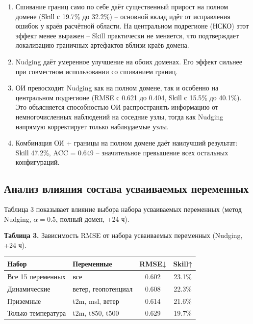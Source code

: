 \documentclass[14pt,a4paper]{extarticle}
\newcounter{none}
\numberwithin{table}{section}
\numberwithin{figure}{section}
\numberwithin{equation}{section}
\begin{document}
\begin{enumerate}
\def\labelenumi{\arabic{enumi}.}
\item
  Сшивание границ само по себе даёт существенный прирост на
  полном домене (Skill с 19.7\% до 32.2\%) -- основной вклад идёт от
  исправления ошибок у краёв расчётной области. На центральном
  подрегионе (НСКО) этот эффект менее выражен -- Skill практически не
  меняется, что подтверждает локализацию граничных артефактов вблизи
  краёв домена.
\item
  Nudging даёт умеренное улучшение на обоих доменах. Его эффект
  сильнее при совместном использовании со сшиванием границ.
\item
  ОИ превосходит Nudging как на полном домене, так и особенно
  на центральном подрегионе (RMSE с 0.621 до 0.404, Skill с 15.5\% до 40.1\%).
  Это объясняется способностью ОИ распространять информацию от
  немногочисленных наблюдений на соседние узлы, тогда как Nudging
  напрямую корректирует только наблюдаемые узлы.
\item
  Комбинация ОИ + границы на полном домене даёт наилучший
  результат: Skill 47.2\%, ACC = 0.649 -- значительное превышение всех
  остальных конфигураций.
\end{enumerate}

\subsection{Анализ влияния состава усваиваемых переменных}\label{ux430ux43dux430ux43bux438ux437-ux432ux43bux438ux44fux43dux438ux44f-ux441ux43eux441ux442ux430ux432ux430-ux443ux441ux432ux430ux438ux432ux430ux435ux43cux44bux445-ux43fux435ux440ux435ux43cux435ux43dux43dux44bux445}

Таблица 3 показывает влияние выбора набора усваиваемых переменных (метод
Nudging, \(\alpha=0.5\), полный домен, +24 ч).

\textbf{Таблица 3.} Зависимость RMSE от набора усваиваемых переменных
(Nudging, +24 ч).

{\def\LTcaptype{none} %
\begin{longtable}[]{@{}llcc@{}}
\toprule\noalign{}
Набор & Переменные & RMSE↓ & Skill↑ \\
\midrule\noalign{}
\endhead
\bottomrule\noalign{}
\endlastfoot
Все 15 переменных & все & 0.602 & 23.1\% \\
Динамические & ветер, геопотенциал & 0.608 & 22.3\% \\
Приземные & t2m, msl, ветер & 0.614 & 21.6\% \\
Только температура & t2m, t850, t500 & 0.629 & 19.7\% \\
\end{longtable}
}
\end{document}

